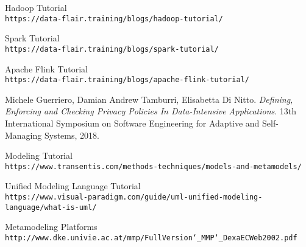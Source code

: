 \begin{thebibliography}{9}

Hadoop Tutorial
\\\texttt{https://data-flair.training/blogs/hadoop-tutorial/}

Spark Tutorial
\\\texttt{https://data-flair.training/blogs/spark-tutorial/}

Apache Flink Tutorial
\\\texttt{https://data-flair.training/blogs/apache-flink-tutorial/}

Michele Guerriero, Damian Andrew Tamburri, Elisabetta Di Nitto.
\textit{Defining, Enforcing and Checking Privacy Policies In Data-Intensive Applications}. 
13th International Symposium on Software Engineering for Adaptive and Self-Managing Systems, 2018.

Modeling Tutorial
\\\texttt{https://www.transentis.com/methods-techniques/models-and-metamodels/}

Unified Modeling Language Tutorial
\\\texttt{https://www.visual-paradigm.com/guide/uml-unified-modeling-language/what-is-uml/}

Metamodeling Platforms
\\\texttt{http://www.dke.univie.ac.at/mmp/FullVersion\char`_MMP\char`_DexaECWeb2002.pdf}

\end{thebibliography}
